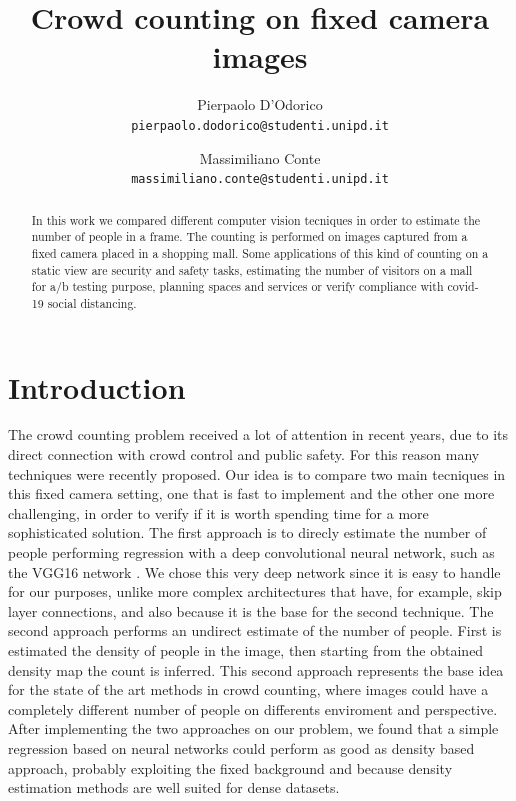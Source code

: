 \documentclass[10pt,twocolumn,letterpaper]{article}
\begin{document}
\title{Crowd counting on fixed camera images}

\author{Pierpaolo D'Odorico\\
{\tt\small pierpaolo.dodorico@studenti.unipd.it}
\and
Massimiliano Conte\\
{\tt\small massimiliano.conte@studenti.unipd.it}
}


\maketitle
\begin{abstract}



In this work we compared different computer vision tecniques in order to estimate the number of people in a frame. The counting is performed on images captured from a fixed camera placed in a shopping mall. Some applications of this kind of counting on a static view are security and safety tasks, estimating the number of visitors on a mall for a/b testing purpose, planning spaces and services or verify compliance with covid-19 social distancing.

\end{abstract}

\section{Introduction}

The crowd counting problem received a lot of attention in recent years, due to its direct connection with crowd control and public safety. For this reason many techniques were recently proposed.
Our idea is to compare two main tecniques in this fixed camera setting, one that is fast to implement and the other one more challenging, in order to verify if it is worth spending time for a more sophisticated solution. The first approach is to direcly estimate the number of people performing regression with a deep convolutional neural network, such as the VGG16 network \cite{simonyan2014very}. We chose this very deep network since it is easy to handle for our purposes, unlike more complex architectures that have, for example, skip layer connections, and also because it is the base for the second technique. The second approach performs an undirect estimate of the number of people. First is estimated the density of people in the image, then starting from the obtained density map the count is inferred. This second approach represents the base idea for the state of the art methods in crowd counting, where images could have a completely different number of people on  differents enviroment and perspective. After implementing the two approaches on our problem, we found that a simple regression based on neural networks could perform as good as density based approach, probably exploiting the fixed background and because density estimation methods are well suited for dense datasets.
\end{document}

